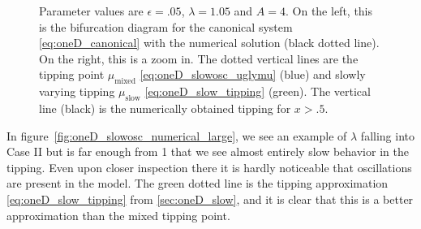 \begin{figure}[H]
\begin{subfigure}{.5\textwidth}
 \caption{}
\end{subfigure}
\caption{Parameter values are $\epsilon=.05$, $\lambda=1.05$ and $A=4$. On the left, this is the bifurcation diagram for the canonical system \eqref{eq:oneD_canonical} with the numerical solution (black dotted line). On the right, this is a zoom in. The dotted vertical lines are the tipping point $\mu_{\text{mixed}}$ \eqref{eq:oneD_slowosc_uglymu} (blue) and slowly varying tipping $\mu_{\text{slow}}$ \eqref{eq:oneD_slow_tipping} (green). The vertical line (black) is the numerically obtained tipping for $x>.5$.}
\label{fig:oneD_slowosc_numerical_medium}
\end{figure}

In figure~\ref{fig:oneD_slowosc_numerical_large}, we see an example of $\lambda$ falling into Case II but is far enough from 1 that we see almost entirely slow behavior in the tipping. Even upon closer inspection there it is hardly noticeable that oscillations are present in the model. The green dotted line is the tipping approximation \eqref{eq:oneD_slow_tipping} from \autoref{sec:oneD_slow}, and it is clear that this is a better approximation than the mixed tipping point.

